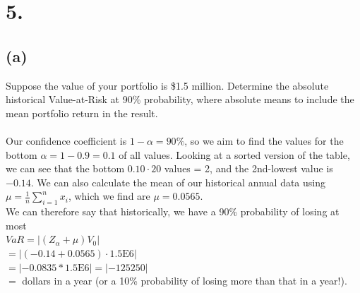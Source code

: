 \documentclass{article}
\begin{document}
\section*{5.}
{\Large 

\subsection*{(a)}

Suppose the value of your portfolio is \$1.5 million. Determine the absolute historical Value-at-Risk at 90\% probability, where absolute means to include the mean portfolio return in the result. \\ \\


Our confidence coefficient is $1 - \alpha = 90\%$, so we aim to find the values for the bottom $\alpha = 1 - 0.9 = 0.1$ of all values. Looking at a sorted version of the table, we can see that the bottom $0.10 \cdot 20$ values = 2, and the 2nd-lowest value is $-0.14$. We can also calculate the mean of our historical annual data using $\mu = \frac{1}{n} \sum_{i=1}^{n} x_i$, which we find are $\mu = 0.0565$. \\
We can therefore say that historically, we have a 90\% probability of losing at most \\
$VaR = |(Z_\alpha + \mu)V_0|$ \\
$= |(-0.14 + 0.0565) \cdot 1.5\text{E6}|$ \\
$= |-0.0835 * 1.5\text{E6}| = |-125250|$ \\
$= $  dollars in a year (or a 10\% probability of losing more than that in a year!).

}
\end{document}
